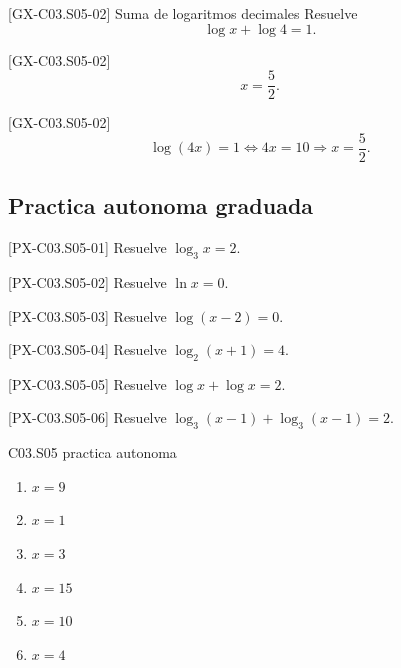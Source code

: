 \begin{guidedexercise}{[GX-C03.S05-02] Suma de logaritmos decimales}
Resuelve
\[
\log x+\log 4=1.
\]
\end{guidedexercise}

\begin{shortanswer}{[GX-C03.S05-02]}
\[
x=\frac{5}{2}.
\]
\end{shortanswer}

\begin{fullsolution}{[GX-C03.S05-02]}
\[
\log(4x)=1 \Longleftrightarrow 4x=10 \Longrightarrow x=\frac{5}{2}.
\]
\end{fullsolution}

\subsection*{Practica autonoma graduada}
\begin{exercise}{[PX-C03.S05-01] Resuelve \(\log_3 x=2\).}
\end{exercise}
\begin{exercise}{[PX-C03.S05-02] Resuelve \(\ln x=0\).}
\end{exercise}
\begin{exercise}{[PX-C03.S05-03] Resuelve \(\log(x-2)=0\).}
\end{exercise}
\begin{exercise}{[PX-C03.S05-04] Resuelve \(\log_2(x+1)=4\).}
\end{exercise}
\begin{exercise}{[PX-C03.S05-05] Resuelve \(\log x+\log x=2\).}
\end{exercise}
\begin{exercise}{[PX-C03.S05-06] Resuelve \(\log_3(x-1)+\log_3(x-1)=2\).}
\end{exercise}

\begin{shortanswer}{C03.S05 practica autonoma}
\begin{enumerate}[label=\textbf{PX-C03.S05-\arabic*:}, leftmargin=*]
  \item \(x=9\)
  \item \(x=1\)
  \item \(x=3\)
  \item \(x=15\)
  \item \(x=10\)
  \item \(x=4\)
\end{enumerate}
\end{shortanswer}

